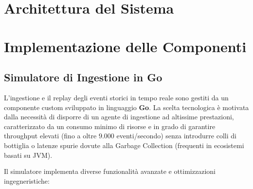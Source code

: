 \documentclass[conference]{IEEEtran}
\begin{document}

\section{Architettura del Sistema}\label{sec:system_architecture}


\section{Implementazione delle Componenti}\label{sec:implementation_details}

\subsection{Simulatore di Ingestione in Go}\label{subsec:go_simulator}
L'ingestione e il replay degli eventi storici in tempo reale sono gestiti da un componente custom sviluppato in linguaggio \textbf{Go}. La scelta tecnologica è motivata dalla necessità di disporre di un agente di ingestione ad altissime prestazioni, caratterizzato da un consumo minimo di risorse e in grado di garantire throughput elevati (fino a oltre $9.000$ eventi/secondo) senza introdurre colli di bottiglia o latenze spurie dovute alla Garbage Collection (frequenti in ecosistemi basati su JVM).

Il simulatore implementa diverse funzionalità avanzate e ottimizzazioni ingegneristiche:
\end{document}
